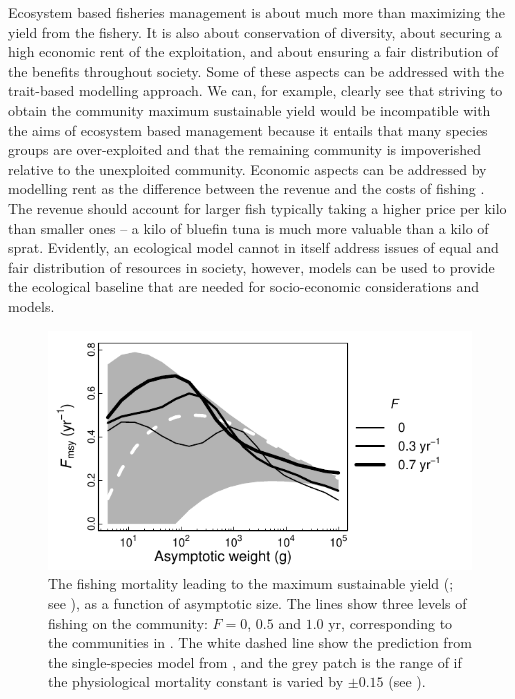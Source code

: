 Ecosystem based fisheries management is about much more than maximizing the yield from the fishery.  It is also about conservation of diversity, about securing a high economic rent of the exploitation, and about ensuring a fair distribution of the benefits throughout society.  Some of these aspects can be addressed with the trait-based modelling approach.  We can, for example, clearly see that striving to obtain the community maximum sustainable yield would be incompatible with the aims of ecosystem based management because it entails that many species groups are over-exploited and that the remaining community is impoverished relative to the unexploited community.  Economic aspects can be addressed by modelling rent as the difference between the revenue and the costs of fishing \citep{Gordon1954, Schaefer1954}.  The revenue should account for larger fish typically taking a higher price per kilo than smaller ones \citep{Andersen2015} --  a kilo of bluefin tuna is much more valuable than a kilo of sprat. Evidently, an ecological model cannot in itself address issues of equal and fair distribution of resources in society, however, models can be used to provide the ecological baseline that are needed for socio-economic considerations and models.  


\begin{figure}[t]
  \centering
  \includegraphics{ChapterCommunityFishing/RefvsF.pdf}
  \caption{The fishing mortality leading to the maximum sustainable yield ({\Fmsy}; see ), as a function of asymptotic size. The lines show three levels of fishing on the community: $F = 0$, $0.5$ and $1.0$ yr\per, corresponding to the communities in . The white dashed line show the prediction from the single-species model from , and the grey patch is the range of {\Fmsy} if the physiological mortality constant is varied by $\pm 0.15$ (see ).}
  \label{fig:RefvsF}
\end{figure}

